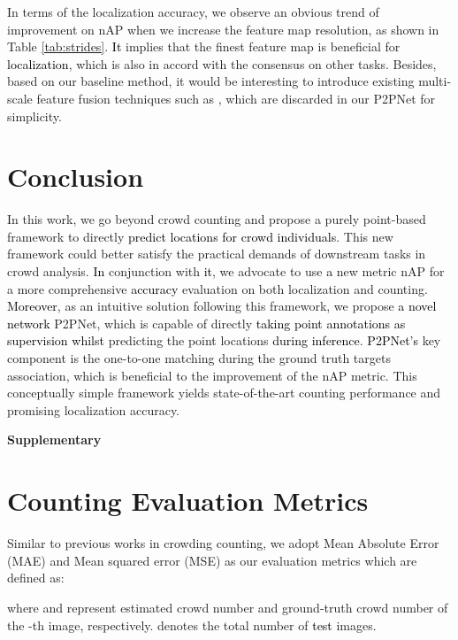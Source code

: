 \documentclass[10pt,twocolumn,letterpaper]{article}
\newcommand{\ywu}[1]{\textcolor{black}{#1}}
\begin{document}
In terms of the localization accuracy, we observe an obvious trend of improvement on nAP when we increase the feature map resolution, as shown in Table \ref{tab:strides}. \ywu{It} implies that the finest feature map is beneficial for \ywu{localization}, which is also in accord with the consensus on other tasks. Besides, based on our baseline method, it would be interesting to introduce existing multi-scale feature fusion techniques such as \cite{lin2017feature}, which are discarded in our P2PNet for simplicity.
\vspace{-0.6em}
\section{Conclusion}
\vspace{-0.6em}
In this work, we go beyond crowd counting and propose a purely point-based framework to directly \ywu{predict locations for crowd individuals}. This new framework could better satisfy the practical demands of downstream tasks in crowd analysis. \ywu{In} conjunction with \ywu{it}, we advocate to use \ywu{a} new metric nAP for a more comprehensive \ywu{accuracy} evaluation on both localization and counting. \ywu{Moreover}, as an intuitive solution following this framework, we propose \ywu{a novel network} P2PNet, which is capable of directly \ywu{taking point annotations as supervision whilst} predicting the point locations \ywu{during inference}. \ywu{P2PNet's} key component is the one-to-one matching during the ground truth targets association, which is beneficial to the improvement of the nAP metric. This conceptually simple framework yields state-of-the-art counting performance and promising localization accuracy. 

{\small


}

\newpage

\begin{center}
\textbf{{\Large Supplementary}}
\end{center}
\setcounter{section}{0}
\section{Counting Evaluation Metrics}\label{metric}
Similar to previous works in crowding counting, we adopt Mean Absolute Error (MAE) and Mean squared error (MSE) as our evaluation metrics which are defined as:


where  and  represent estimated crowd number and ground-truth crowd number of the -th image\ywu{,} respectively.  denotes the total number of \ywu{test} images.
\end{document}
